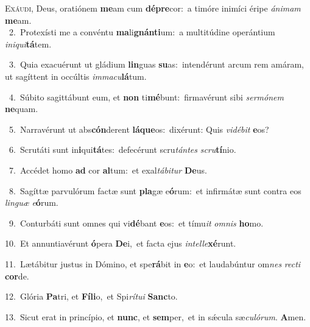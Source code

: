 \lettrine{\initial\textcolor{\initialcolor}{E}}{xáudi,} Deus, oratiónem \textbf{me}\-am cum \textbf{dé}\-\textbf{pre}cor:~\star a timóre inimíci éripe \textit{á}\-\textit{ni}\textit{mam} \textbf{me}\-am.\\
{\numbfont\textcolor{\numbcolor}{~2.}}~Protexísti me a convéntu \textbf{ma}\-li\-\textbf{gnán}\-\textbf{ti}um:~\star a multitúdine operántium \textit{in}\-\textit{i}\textit{qui}\textbf{tá}tem.\par
{\numbfont\textcolor{\numbcolor}{~3.}}~Quia exacuérunt ut gládium \textbf{lin}\-guas \textbf{su}\-as:~\star intendérunt arcum rem amáram, ut sagíttent in occúltis \textit{im}\-\textit{ma}\textit{cu}\textbf{lá}tum.\par
{\numbfont\textcolor{\numbcolor}{~4.}}~Súbito sagittábunt eum, et \textbf{non} ti\-\textbf{mé}\-bunt:~\star firmavérunt sibi \textit{ser}\-\textit{mó}\textit{nem} \textbf{ne}\-quam.\par
{\numbfont\textcolor{\numbcolor}{~5.}}~Narravérunt ut abs\-\textbf{cón}\-derent \textbf{lá}\-\textbf{que}os:~\star dixérunt: Quis \textit{vi}\-\textit{dé}\textit{bit} \textbf{e}\-os?\par
{\numbfont\textcolor{\numbcolor}{~6.}}~Scrutáti sunt in\-\textbf{i}\-qui\-\textbf{tá}\-tes:~\star defecérunt scru\-\textit{tán}\-\textit{tes} \textit{scru}\-\textbf{tí}nio.\par
{\numbfont\textcolor{\numbcolor}{~7.}}~Accédet homo \textbf{ad} cor \textbf{al}\-tum:~\star et exal\-\textit{tá}\-\textit{bi}\textit{tur} \textbf{De}\-us.\par
{\numbfont\textcolor{\numbcolor}{~8.}}~Sagíttæ parvulórum factæ sunt \textbf{pla}\-gæ e\-\textbf{ó}\-rum:~\star et infirmátæ sunt contra eos \textit{lin}\-\textit{guæ} \textit{e}\-\textbf{ó}rum.\par
{\numbfont\textcolor{\numbcolor}{~9.}}~Conturbáti sunt omnes qui vi\-\textbf{dé}\-bant \textbf{e}\-os:~\star et tímu\textit{it} \textit{om}\-\textit{nis} \textbf{ho}\-mo.\par
{\numbfont\textcolor{\numbcolor}{10.}}~Et annuntiavérunt \textbf{ó}\-pera \textbf{De}\-i,~\star et facta ejus \textit{in}\-\textit{tel}\textit{le}\textbf{xé}runt.\par
{\numbfont\textcolor{\numbcolor}{11.}}~Lætábitur justus in Dómino, et spe\-\textbf{rá}\-bit in \textbf{e}\-o:~\star et laudabúntur om\textit{nes} \textit{rec}\-\textit{ti} \textbf{cor}\-de.\par
{\numbfont\textcolor{\numbcolor}{12.}}~Glória \textbf{Pa}\-tri, et \textbf{Fí}\-\textbf{li}o,~\star et Spi\-\textit{rí}\-\textit{tu}\textit{i} \textbf{Sanc}\-to.\par
{\numbfont\textcolor{\numbcolor}{13.}}~Sicut erat in princípio, et \textbf{nunc}\-, et \textbf{sem}\-per,~\star et in sǽcula sæ\-\textit{cu}\-\textit{ló}\textit{rum}. \textbf{A}\-men.\par
